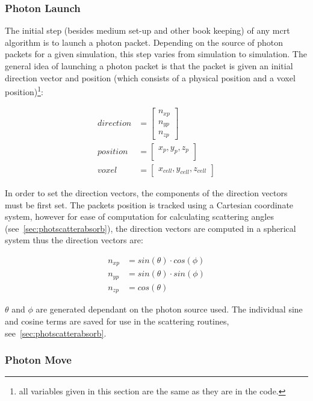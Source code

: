 \subsubsection{Photon Launch}\label{sec:photlaunch}

The initial step (besides medium set-up and other book keeping) of any \gls{mcrt} algorithm is to launch a photon packet. Depending on the source of photon packets for a given simulation, this step varies from simulation to simulation. The general idea of launching a photon packet is that the packet is given an initial direction vector and position (which consists of a physical position and a voxel position)\footnote{all variables given in this section are the same as they are in the code.}:

\begin{align}
	direction &= \begin{bmatrix}
		n_{xp}\\
		n_{yp}\\
		n_{zp}
	\end{bmatrix}\\
	position &= \begin{bmatrix}
		x_p, y_p, z_p\\
	\end{bmatrix}\\
	voxel &= \begin{bmatrix}
		x_{cell}, y_{cell}, z_{cell}
	\end{bmatrix}	 
\end{align}

In order to set the direction vectors, the components of the direction vectors must be first set. The packets position is tracked using a Cartesian coordinate system, however for ease of computation for calculating scattering angles (see~\cref{sec:photscatterabsorb}), the direction vectors are computed in a spherical system thus the direction vectors are: 

\begin{align}
n_{xp} &= sin(\theta) \cdot cos(\phi) \\
n_{yp} &= sin(\theta) \cdot sin(\phi) \\
n_{zp} &= cos(\theta)
\end{align}

$\theta$ and $\phi$ are generated dependant on the photon source used. The individual sine and cosine terms are saved for use in the scattering routines, see~\cref{sec:photscatterabsorb}.

\subsubsection{Photon Move}\label{sec:photmove}

